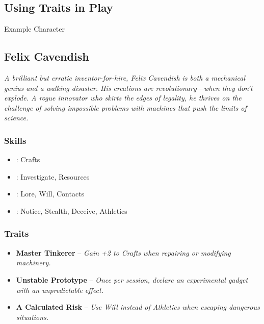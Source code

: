 \subsection{Using Traits in Play}
\begin{DndSidebar}[float=!t]{Example Character}
	\subsection{Felix Cavendish}
	\emph{A brilliant but erratic inventor-for-hire, Felix Cavendish is both a mechanical genius and a walking disaster. His creations are revolutionary—when they don’t explode. A rogue innovator who skirts the edges of legality, he thrives on the challenge of solving impossible problems with machines that push the limits of science.}

	\subsubsection*{Skills}
	\begin{itemize}
    	\item \Expert: Crafts
	    \item \Skilled: Investigate, Resources
    	\item \Novice: Lore, Will, Contacts
	    \item \Untrained: Notice, Stealth, Deceive, Athletics
	\end{itemize}

	\subsubsection*{Traits}
	\begin{itemize}
    	\item \textbf{Master Tinkerer} – \emph{Gain +2 to Crafts when repairing or modifying machinery.}
	    \item \textbf{Unstable Prototype} – \emph{Once per session, declare an experimental gadget with an unpredictable effect.}
    	\item \textbf{A Calculated Risk} – \emph{Use Will instead of Athletics when escaping dangerous situations.}
	\end{itemize}
\end{DndSidebar}
